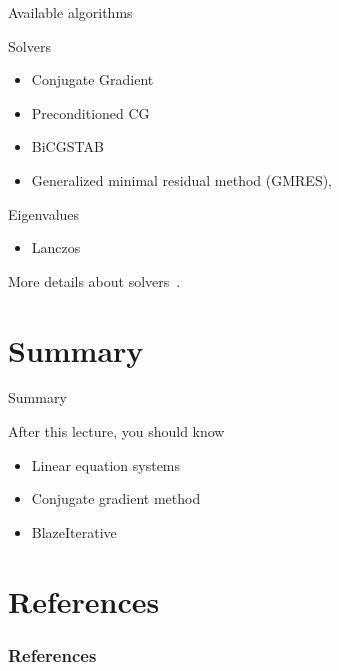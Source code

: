 \documentclass[12pt,t]{beamer}
\begin{document}
\begin{frame}{Available algorithms}

\begin{block}{Solvers}
\begin{itemize}
\item Conjugate Gradient
\item Preconditioned CG
\item BiCGSTAB
\item Generalized minimal residual method (GMRES),
\end{itemize}
\end{block}


\begin{block}{Eigenvalues}
\begin{itemize}
\item Lanczos
\end{itemize}
\end{block}
More details about solvers~\cite{barrett1994templates}.
\end{frame}




\section{Summary}
\begin{frame}{Summary}
\begin{block}{After this lecture, you should know}
\begin{itemize}
\item Linear equation systems
\item Conjugate gradient method
\item BlazeIterative
\end{itemize}
\end{block}
\end{frame}

\section{References}

\begin{frame}[t, allowframebreaks]
\frametitle{References}


\end{frame}
\end{document}
